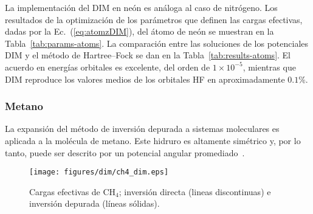 La implementación del DIM en neón es análoga al caso de nitrógeno. Los 
resultados de la optimización de los parámetros que definen las cargas 
efectivas, dadas por la Ec.~(\ref{eq:atomzDIM}), del átomo de neón se 
muestran en la Tabla~\ref{tab:params-atoms}. La comparación entre las 
soluciones de los potenciales DIM y el método de Hartree--Fock se dan en 
la Tabla~\ref{tab:results-atoms}. El acuerdo en energías orbitales es 
excelente, del orden de $1\times 10^{-5}$, mientras que DIM reproduce 
los valores medios de los orbitales HF en aproximadamente $0.1\%$. 

\subsubsection*{Metano}

La expansión del método de inversión depurada a sistemas moleculares es 
aplicada a la molécula de metano. Este hidruro es altamente simétrico y, 
por lo tanto, puede ser descrito por un potencial angular  
promediado~\cite{Granados:16}. 

\begin{figure}[t]
\centering
\texttt{[image: figures/dim/ch4\_dim.eps]}
\caption[Cargas efectivas DIM de metano.]
{Cargas efectivas de CH$_4$; inversión directa (lineas discontinuas)
e inversión depurada (líneas sólidas).}
\label{fig:ch4zeff}
\end{figure}

